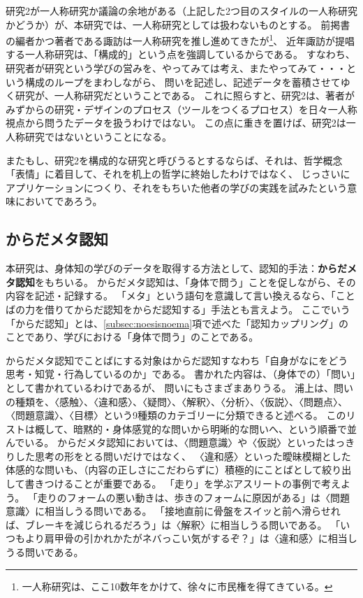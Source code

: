 研究2が一人称研究か議論の余地がある（上記した2つ目のスタイルの一人称研究かどうか）が、本研究では、一人称研究としては扱わないものとする。
前掲書\cite{suwa_hori:2015}の編者かつ著者である諏訪は一人称研究を推し進めてきたが\footnote{
  一人称研究は、ここ10数年をかけて、徐々に市民権を得てきている。
}、
近年諏訪が提唱する一人称研究\cite{suwa:2022}は、「構成的」という点を強調しているからである。
すなわち、研究者が研究という学びの営みを、やってみては考え、またやってみて・・・という構成のループをまわしながら、
問いを記述し、記述データを蓄積させてゆく研究が、一人称研究だということである。
これに照らすと、研究2は、著者がみずからの研究・デザインのプロセス（ツールをつくるプロセス）を日々一人称視点から問うたデータを扱うわけではない。
この点に重きを置けば、研究2は一人称研究ではないということになる。

またもし、研究2を構成的な研究と呼びうるとするならば、それは、哲学概念「表情」\cite{hiromatsu:1989}に着目して、それを机上の哲学に終始したわけではなく、
じっさいにアプリケーションにつくり、それをもちいた他者の学びの実践を試みたという意味においてであろう。

\subsection{からだメタ認知}
\label{subsec:embodiedmetacognition}

本研究は、身体知の学びのデータを取得する方法として、認知的手法：\textbf{からだメタ認知}\cite{suwa:2016, suwa:2022}をもちいる。
からだメタ認知は、「身体で問う」ことを促しながら、その内容を記述・記録する。
「メタ」という語句を意識して言い換えるなら、「ことばの力を借りてからだ認知をからだ認知する」手法とも言えよう。
ここでいう「からだ認知」とは、\ref{subsec:noesisnoema}項で述べた「認知カップリング」のことであり、学びにおける「身体で問う」のことである。

からだメタ認知でことばにする対象はからだ認知すなわち「自身がなにをどう思考・知覚・行為しているのか」である。
書かれた内容は、（身体での）「問い」として書かれているわけであるが、
問いにもさまざまありうる。
浦上\cite{uragami:2015}は、問いの種類を、〈感触〉、〈違和感〉、〈疑問〉、〈解釈〉、〈分析〉、〈仮説〉、〈問題点〉、〈問題意識〉、〈目標〉という9種類のカテゴリーに分類できると述べる。
このリストは概して、暗黙的・身体感覚的な問いから明晰的な問いへ、という順番で並んでいる。
からだメタ認知においては、〈問題意識〉や〈仮説〉といったはっきりした思考の形をとる問いだけではなく、
〈違和感〉といった曖昧模糊とした体感的な問いも、（内容の正しさにこだわらずに）積極的にことばとして絞り出して書きつけることが重要である。
「走り」を学ぶアスリートの事例で考えよう。
「走りのフォームの悪い動きは、歩きのフォームに原因がある」は〈問題意識〉に相当しうる問いである。
「接地直前に骨盤をスイッと前へ滑らせれば、ブレーキを減じられるだろう」は〈解釈〉に相当しうる問いである。
「いつもより肩甲骨の引かれかたがネバっこい気がするぞ？」は〈違和感〉に相当しうる問いである。

